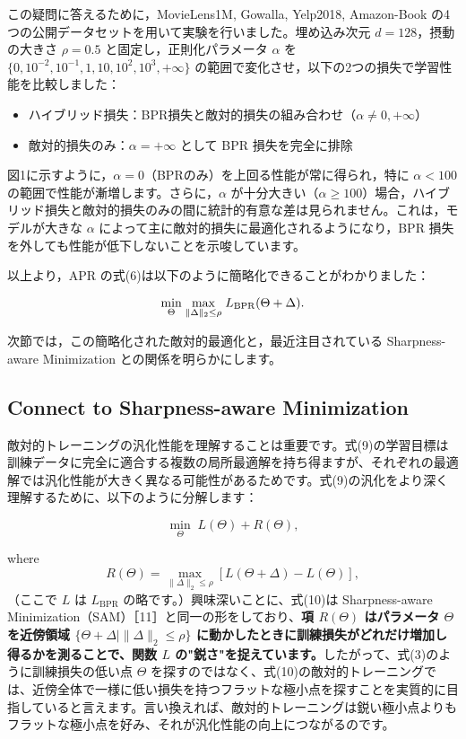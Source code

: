 \documentclass[11pt,a4paper]{article}
\begin{document}
この疑問に答えるために，MovieLens1M, Gowalla, Yelp2018, Amazon-Book の4つの公開データセットを用いて実験を行いました。埋め込み次元 $d=128$，摂動の大きさ $\rho=0.5$ と固定し，正則化パラメータ $\alpha$ を $\{0, 10^{-2}, 10^{-1}, 1, 10, 10^2, 10^3, +\infty\}$ の範囲で変化させ，以下の2つの損失で学習性能を比較しました：

\begin{itemize}
    \item ハイブリッド損失：BPR損失と敵対的損失の組み合わせ（$\alpha \neq 0, +\infty$）
    \item 敵対的損失のみ：$\alpha = +\infty$ として BPR 損失を完全に排除
\end{itemize}

図1に示すように，$\alpha = 0$（BPRのみ）を上回る性能が常に得られ，特に $\alpha < 100$ の範囲で性能が漸増します。さらに，$\alpha$ が十分大きい（$\alpha \geq 100$）場合，ハイブリッド損失と敵対的損失のみの間に統計的有意な差は見られません。これは，モデルが大きな $\alpha$ によって主に敵対的損失に最適化されるようになり，BPR 損失を外しても性能が低下しないことを示唆しています。

以上より，APR の式(6)は以下のように簡略化できることがわかりました：

\begin{equation}
\underset{\Theta}{\min} \; \underset{\|\Delta\|_2 \le \rho}{\max} \; L_{\rm BPR}(\Theta + \Delta).
\end{equation}

次節では，この簡略化された敵対的最適化と，最近注目されている Sharpness-aware Minimization との関係を明らかにします。

\subsection{Connect to Sharpness-aware Minimization}

敵対的トレーニングの汎化性能を理解することは重要です。式(9)の学習目標は訓練データに完全に適合する複数の局所最適解を持ち得ますが、それぞれの最適解では汎化性能が大きく異なる可能性があるためです。式(9)の汎化をより深く理解するために、以下のように分解します：

\begin{equation}
\underset{\Theta}{\min} \; L(\Theta) + R(\Theta),
\end{equation}

where
\begin{equation}
R(\Theta) = \underset{\|\Delta\|_2 \le \rho}{\max} [L(\Theta + \Delta) - L(\Theta)],
\end{equation}
（ここで $L$ は $L_{\text{BPR}}$ の略です。）興味深いことに、式(10)は Sharpness-aware Minimization（SAM）［11］と同一の形をしており、\textbf{項 $R(\Theta)$ はパラメータ $\Theta$ を近傍領域 $\{\Theta+\Delta \mid \|\Delta\|_2 \leq \rho\}$ に動かしたときに訓練損失がどれだけ増加し得るかを測ることで、関数 $L$ の"鋭さ"を捉えています。}したがって、式(3)のように訓練損失の低い点 $\Theta$ を探すのではなく、式(10)の敵対的トレーニングでは、近傍全体で一様に低い損失を持つフラットな極小点を探すことを実質的に目指していると言えます。言い換えれば、敵対的トレーニングは鋭い極小点よりもフラットな極小点を好み、それが汎化性能の向上につながるのです。
\end{document}
